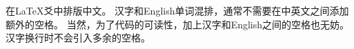 \documentclass{ctexart}
\begin{document}
在\LaTeX{}爻中排版中文。
汉字和English单词混排，通常不需要在中英文之间添加额外的空格。
当然，为了代码的可读性，加上汉字和English之间的空格也无妨。
汉字换行时不会引入多余的空格。
\end{document}
